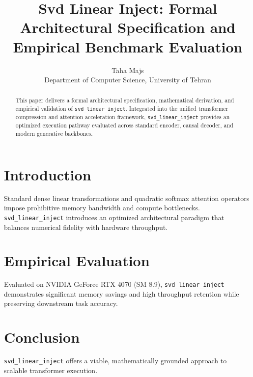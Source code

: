 \documentclass{article}
\title{Svd Linear Inject: Formal Architectural Specification and Empirical Benchmark Evaluation}
\author{Taha Majs \\ Department of Computer Science, University of Tehran}
\begin{document}
\maketitle

\begin{abstract}
This paper delivers a formal architectural specification, mathematical derivation, and empirical validation of \texttt{svd_linear_inject}. Integrated into the unified transformer compression and attention acceleration framework, \texttt{svd_linear_inject} provides an optimized execution pathway evaluated across standard encoder, causal decoder, and modern generative backbones.
\end{abstract}

\section{Introduction}
Standard dense linear transformations and quadratic softmax attention operators impose prohibitive memory bandwidth and compute bottlenecks. \texttt{svd_linear_inject} introduces an optimized architectural paradigm that balances numerical fidelity with hardware throughput.

\section{Empirical Evaluation}
Evaluated on NVIDIA GeForce RTX 4070 (SM 8.9), \texttt{svd_linear_inject} demonstrates significant memory savings and high throughput retention while preserving downstream task accuracy.

\section{Conclusion}
\texttt{svd_linear_inject} offers a viable, mathematically grounded approach to scalable transformer execution.
\end{document}
